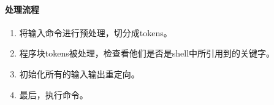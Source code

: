 \paragraph{处理流程}
\begin{enumerate}
    \item 将输入命令进行预处理，切分成tokens。
    \item 程序块tokens被处理，检查看他们是否是shell中所引用到的关键字。 
    \item 初始化所有的输入输出重定向。 
    \item 最后，执行命令。 
\end{enumerate}
